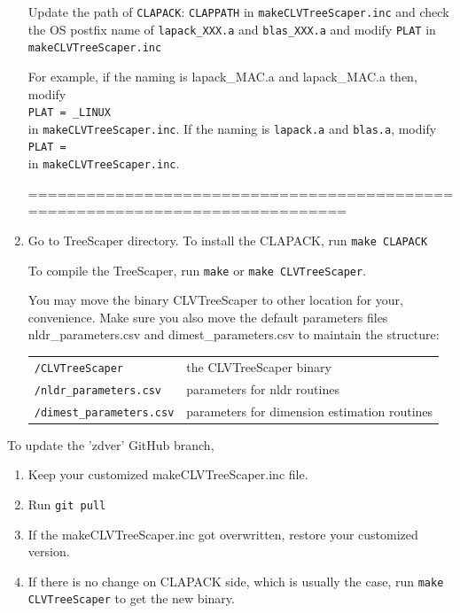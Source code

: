 \documentclass[11pt,a4paper]{article}
\theoremstyle{definition}
\theoremstyle{definition}
\numberwithin{equation}{section}
\begin{document}
\begin{enumerate}[label = (\arabic*)]
		
		
		
		Update the path of \texttt{CLAPACK}:
		\texttt{CLAPPATH} in \texttt{makeCLVTreeScaper.inc}
		and check the OS postfix name of \texttt{lapack\_XXX.a} and \texttt{blas\_XXX.a} and modify
		\texttt{PLAT} in \texttt{makeCLVTreeScaper.inc}
		
		For example, if the naming is lapack\_MAC.a and lapack\_MAC.a then, modify\\
		\texttt{PLAT = \_LINUX}\\
		in \texttt{makeCLVTreeScaper.inc}. If the naming is \texttt{lapack.a} and \texttt{blas.a}, modify\\
		\texttt{PLAT =}\\
		in \texttt{makeCLVTreeScaper.inc}.
		
		=============================================================================
		
		\item Go to TreeScaper directory. To install the CLAPACK,
		run \texttt{make CLAPACK}
		
		To compile the TreeScaper, run \texttt{make} or \texttt{make CLVTreeScaper}.
		
		You may move the binary CLVTreeScaper to other location for your,
		convenience. Make sure you also move the default parameters files 
		nldr\_parameters.csv and dimest\_parameters.csv to maintain the structure:
		
		\begin{table}[!h]
			\begin{tabular}{ll}
				\texttt{/CLVTreeScaper}           &the CLVTreeScaper binary\\
				\texttt{/nldr\_parameters.csv}    &parameters for nldr routines\\
				\texttt{/dimest\_parameters.csv}  &parameters for dimension estimation routines\\
			\end{tabular}
		\end{table} 
		
		
	\end{enumerate}
	
	
	
	

	To update the 'zdver' GitHub branch,
	\begin{enumerate}[label = \arabic*)]
		\item Keep your customized makeCLVTreeScaper.inc file.
		\item  Run \texttt{git pull}
		\item If the makeCLVTreeScaper.inc got overwritten, restore your
		customized version.
		\item If there is no change on CLAPACK side, which is usually the case,
		run \texttt{make CLVTreeScaper} to get the new binary.
	\end{enumerate}
	
\end{document}
